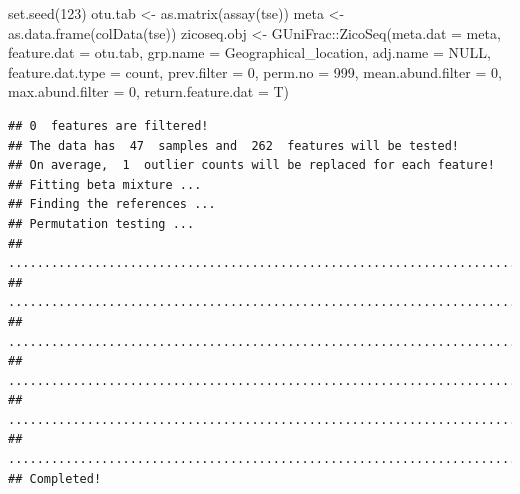 \documentclass[
]{book}
\newenvironment{Shaded}{\begin{snugshade}}{\end{snugshade}}
\newcommand{\AttributeTok}[1]{\textcolor[rgb]{0.77,0.63,0.00}{#1}}
\newcommand{\ConstantTok}[1]{\textcolor[rgb]{0.00,0.00,0.00}{#1}}
\newcommand{\DecValTok}[1]{\textcolor[rgb]{0.00,0.00,0.81}{#1}}
\newcommand{\FunctionTok}[1]{\textcolor[rgb]{0.00,0.00,0.00}{#1}}
\newcommand{\NormalTok}[1]{#1}
\newcommand{\OtherTok}[1]{\textcolor[rgb]{0.56,0.35,0.01}{#1}}
\newcommand{\SpecialCharTok}[1]{\textcolor[rgb]{0.00,0.00,0.00}{#1}}
\newcommand{\StringTok}[1]{\textcolor[rgb]{0.31,0.60,0.02}{#1}}
\begin{document}
\begin{Shaded}
\begin{Highlighting}[]
\FunctionTok{set.seed}\NormalTok{(}\DecValTok{123}\NormalTok{)}
\NormalTok{otu.tab }\OtherTok{\textless{}{-}} \FunctionTok{as.matrix}\NormalTok{(}\FunctionTok{assay}\NormalTok{(tse))}
\NormalTok{meta }\OtherTok{\textless{}{-}} \FunctionTok{as.data.frame}\NormalTok{(}\FunctionTok{colData}\NormalTok{(tse)) }
\NormalTok{zicoseq.obj }\OtherTok{\textless{}{-}}\NormalTok{ GUniFrac}\SpecialCharTok{::}\FunctionTok{ZicoSeq}\NormalTok{(}\AttributeTok{meta.dat =}\NormalTok{ meta, }
                                 \AttributeTok{feature.dat =}\NormalTok{ otu.tab,}
                                 \AttributeTok{grp.name =} \StringTok{\textquotesingle{}Geographical\_location\textquotesingle{}}\NormalTok{,}
                                 \AttributeTok{adj.name =} \ConstantTok{NULL}\NormalTok{, }
                                 \AttributeTok{feature.dat.type =} \StringTok{\textquotesingle{}count\textquotesingle{}}\NormalTok{,}
                                 \AttributeTok{prev.filter =} \DecValTok{0}\NormalTok{,}
                                 \AttributeTok{perm.no =} \DecValTok{999}\NormalTok{,}
                                 \AttributeTok{mean.abund.filter =} \DecValTok{0}\NormalTok{,}
                                 \AttributeTok{max.abund.filter =} \DecValTok{0}\NormalTok{,}
                                 \AttributeTok{return.feature.dat =}\NormalTok{ T)}
\end{Highlighting}
\end{Shaded}

\begin{verbatim}
## 0  features are filtered!
## The data has  47  samples and  262  features will be tested!
## On average,  1  outlier counts will be replaced for each feature!
## Fitting beta mixture ...
## Finding the references ...
## Permutation testing ...
## ...................................................................................................
## ...................................................................................................
## ...................................................................................................
## ...................................................................................................
## ...................................................................................................
## ...................................................................................................
## Completed!
\end{verbatim}
\end{document}
